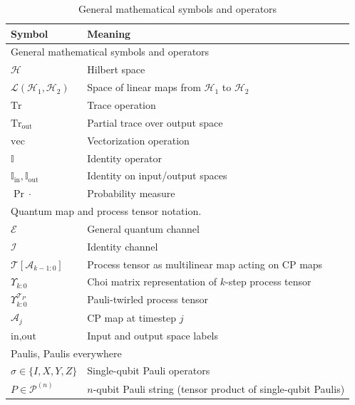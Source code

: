 
\begin{table}[h!]
\centering
\caption{General mathematical symbols and operators}
\begin{tabular}{ll}
\hline
\textbf{Symbol} & \textbf{Meaning} \\
\hline
\multicolumn{2}{l}{General mathematical symbols and operators} \\
\hline
\(\mathcal{H}\) & Hilbert space \\
\(\mathcal{L}(\mathcal{H}_1, \mathcal{H}_2)\) & Space of linear maps from \(\mathcal{H}_1\) to \(\mathcal{H}_2\) \\ %
\(\mathrm{Tr}\) & Trace operation  \\
\(\mathrm{Tr}_{\text{out}}\) & Partial trace over output space  \\
\(\mathrm{vec}\) & Vectorization operation  \\
\(\mathbb{I}\) & Identity operator  \\
\(\mathbb{I}_{\text{in}}, \mathbb{I}_{\text{out}}\) & Identity on input/output spaces  \\
\(\Pr{\cdot}\) & Probability measure  \\
\hline
\multicolumn{2}{l}{Quantum map and process tensor notation.} \\
\hline
\(\mathcal{E}\) & General quantum channel  \\
\(\mathcal{I}\) & Identity channel  \\
\(\mathcal{T}[\mathcal{A}_{k-1:0}]\) & Process tensor as multilinear map acting on CP maps  \\
\(\Upsilon_{k:0}\) & Choi matrix representation of \(k\)-step process tensor  \\
\(\Upsilon_{k:0}^{\mathcal{T}_P}\) & Pauli-twirled process tensor  \\
\(\mathcal{A}_j\) & CP map at timestep \(j\)  \\ %
\(\text{in}, \text{out}\) & Input and output space labels  \\
\hline
\multicolumn{2}{l}{Paulis, Paulis everywhere} \\
\hline
\(\sigma \in \{I, X, Y, Z\}\) & Single-qubit Pauli operators  \\
\(P \in \mathcal{P}^{(n)}\) & \(n\)-qubit Pauli string (tensor product of single-qubit Paulis)  \\

\end{tabular}
\end{table}
